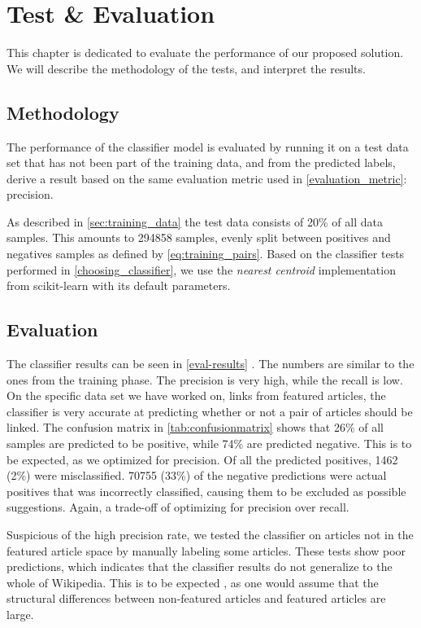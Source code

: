 \chapter{Test \& Evaluation}\label{chap:testeval}
This chapter is dedicated to evaluate the performance of our proposed solution. We will describe the methodology of the tests, and interpret the results.

\section{Methodology}
The performance of the classifier model is evaluated by running it on a test data set that has not been part of the training data, and from the predicted labels, derive a result based on the same evaluation metric used in \cref{evaluation_metric}: precision.

As described in \cref{sec:training_data} the test data consists of 20\% of all data samples. This amounts to \num{294858} samples, evenly split between positives and negatives samples as defined by \cref{eq:training_pairs}. Based on the classifier tests performed in \cref{choosing_classifier}, we use the \emph{nearest centroid} implementation from scikit-learn with its default parameters.

\section{Evaluation}
The classifier results can be seen in \cref{eval-results} . The numbers  are similar to the ones from the training phase. The precision is very high, while the recall is low. On the specific data set we have worked on, links from featured articles, the classifier is very accurate at predicting whether or not a pair of articles should be linked. The confusion matrix in \cref{tab:confusionmatrix} shows that 26\% of all samples are predicted to be positive, while 74\% are predicted negative. This is to be expected, as we optimized for precision.  Of all the predicted positives, 1462 (2\%) were misclassified. \num{70755} (33\%) of the negative predictions were actual positives that was incorrectly classified, causing them to be excluded as possible suggestions. Again, a trade-off of optimizing for precision over recall. 

Suspicious of the high precision rate, we tested the classifier on articles not in the featured article space by manually labeling some articles. These tests show poor predictions, which indicates that the classifier results do not generalize to the whole of Wikipedia. This is to be expected , as one would assume that the structural differences between non-featured articles and featured articles are large.

